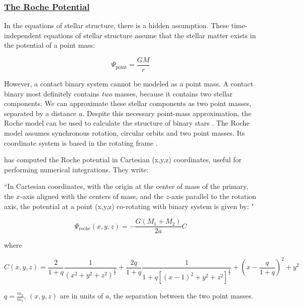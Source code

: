 \documentclass[12pt]{article} %
\numberwithin{equation}{section} %
\begin{document}
\subsubsection[The Roche Potential]{\hyperlink{toc}{The Roche Potential}} \label{sec: The Roche Potential}

In the equations of stellar structure, there is a hidden assumption. These time-independent equations of stellar structure assume that the stellar matter exists in the potential of a point mass:

\begin{equation} \label{point_mass}
\Psi_{\text{point}} = \frac{GM}{r}
\end{equation}

However, a contact binary system cannot be modeled as a point mass. A contact binary most definitely contains \emph{two} masses, because it contains two stellar components. We can approximate these stellar components as two point masses, separated by a distance $a$. Despite this necessary point-mass approximation, the Roche model can be used to calculate the structure of binary stars \citep{kippenhahn1970simple}. The Roche model assumes synchronous rotation, circular orbits and two point masses. Its coordinate system is based in the rotating frame \citep{kopal1959close}.

\citet{mochnacki1984accurate} has computed the Roche potential in Cartesian (x,y,z) coordinates, useful for performing numerical integrations. They write:

``In Cartesian coordinates, with the origin at the center of mass of the primary, the $x$-axis aligned with the centers of mass, and the $z$-axis parallel to the rotation axis, the potential at a point (x,y,z) co-rotating with binary system is given by: "

\begin{equation} \label{eqn: roche1}
\Psi_{\text{roche}}(x,y,z)= -\frac{G(M_{1} + M_{2})}{2a} C
\end{equation}

where 

\begin{equation} \label{eqn: roche2}
C(x,y,z) = \frac{2}{1+q} \frac{1}{(x^{2} + y^{2} + z^{2})^{\frac{1}{2}}} + \frac{2q}{1 + q} \frac{1}{1 + q[(x -1)^{2} + y^{2} + z^{2}]^{\frac{1}{2}}} + (x - \frac{q}{1 + q})^{2} + y^{2}
\end{equation}

$q = \frac{m_{2}}{m_{1}}$, $(x,y,z)$ are in units of $a$, the separation between the two point masses.
\end{document}
